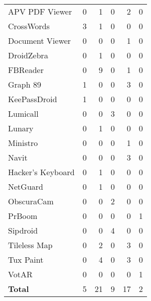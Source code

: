 \begin{table}[t]
\begin{tabular}{l||r|r|r|r|r}
    APV PDF Viewer    & 0 & 1 & 0 & \cellcolor{\succcolor}2 & 0 \\ 
    CrossWords        & \cellcolor{\succcolor}3 & 1 & 0 & 0 & 0 \\ 
    Document Viewer   & 0 & 0 & 0 & \cellcolor{\succcolor}1 & 0 \\ 
    DroidZebra        & 0 & 1 & 0 & 0 & 0 \\ 
    FBReader          & 0 & 9 & 0 & \cellcolor{\succcolor}1 & 0 \\ 
    Graph 89          & \cellcolor{\succcolor}1 & 0 & 0 & \cellcolor{\succcolor}3 & 0 \\ 
    KeePassDroid      & \cellcolor{\succcolor}1 & 0 & 0 & 0 & 0 \\
    Lumicall          & 0 & 0 & \cellcolor{\succcolor}3 & 0 & 0 \\ 
    Lunary            & 0 & 1 & 0 & 0 & 0 \\
    Ministro          & 0 & 0 & 0 & \cellcolor{\succcolor}1 & 0 \\ 
    Navit             & 0 & 0 & 0 & \cellcolor{\succcolor}3 & 0 \\ 
    Hacker's Keyboard & 0 & 1 & 0 & 0 & 0 \\ 
    NetGuard          & 0 & 1 & 0 & 0 & 0 \\ 
    ObscuraCam        & 0 & 0 & \cellcolor{\succcolor}2 & 0 & 0 \\ 
    PrBoom            & 0 & 0 & 0 & 0 & \cellcolor{\succcolor}1 \\
    Sipdroid          & 0 & 0 & \cellcolor{\succcolor}4 & 0 & 0 \\ 
    Tileless Map      & 0 & 2 & 0 & \cellcolor{\succcolor}3 & 0 \\ 
    Tux Paint         & 0 & 4 & 0 & \cellcolor{\succcolor}3 & 0 \\ 
    VotAR             & 0 & 0 & 0 & 0 & \cellcolor{\succcolor}1 \\\hhline{=#=|=|=|=|=}
    \textbf{Total}    & 5 & 21 & 9 & 17 & 2 \\
  \end{tabular}
\end{table}

